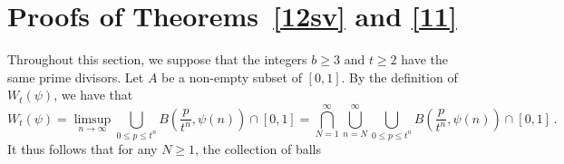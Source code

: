 \documentclass[12pt]{article}
\newtheorem{lemma}{Lemma}[section]
\theoremstyle{definition}
\newtheorem{definition}{Definition}[section]
\theoremstyle{remark}
\begin{document}


 

\section{Proofs of Theorems~\ref{12sv} and \ref{11}}\label{412}
Throughout this section, we suppose that the integers $b \ge 3$ and $t \ge 2$ have the same prime divisors.  Let $A$ be a non-empty subset of $[0,1]$. By the definition of $W_{t}(\psi)$, we have that
$$W_{t}(\psi) = \limsup\limits_{n\to\infty}\bigcup_{0\leq p\leq t^{n}}B\left(\frac{p}{t^{n}},\psi(n)\right)\cap[0,1]=\bigcap_{N=1}^{\infty}\bigcup_{n=N}^{\infty}\bigcup_{0\leq p\leq t^{n}} B\left(\frac{p}{t^{n}},\psi(n)\right)\cap[0,1] \, .$$
It thus follows  that   for any $N \ge 1 $,  the collection of balls 
\end{document}
